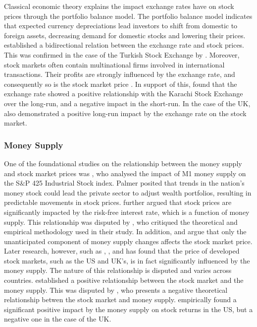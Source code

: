 \documentclass[11pt,a4paper]{article}
\newcommand{\citeboth}[1]{\citeauthor{#1} \citep{#1}}
\begin{document}
Classical economic theory explains the impact exchange rates have on stock prices through the portfolio balance model. The portfolio balance model indicates that expected currency depreciations lead investors to shift from domestic to foreign assets, decreasing demand for domestic stocks and lowering their prices. 
\citeboth{branson1977} established a bidirectional relation between the exchange rate and stock prices. This was confirmed
in the case of the Turkish Stock Exchange by \citeboth{aydemir2009}. 
Moreover, stock markets often contain multinational firms involved in international transactions. Their profits are strongly influenced by the exchange rate, and consequently so is the stock market price \citep{Wong2018}.
In support of this, \citeboth{khan2018} found that the exchange rate showed a positive relationship with the Karachi Stock Exchange over the long-run, and a negative impact in the short-run. 
In the case of the UK, \citeboth{wong2022} also demonstrated a positive long-run impact by the exchange rate on the stock market.

\subsubsection{Money Supply}

One of the foundational studies on the relationship between the money supply and 
stock market prices was \citeboth{palmer1970}, who analysed the impact of M1 money supply on the S$\&$P 425 Industrial Stock index. 
Palmer posited that trends in the nation's money stock could lead the 
private sector to adjust wealth portfolios, resulting in 
predictable movements in stock prices. \citeboth{homa1971} further argued that 
stock prices are significantly impacted by the risk-free interest rate, 
which is a function of money supply. This relationship was disputed by \citeboth{pesando1974}, 
who critiqued the theoretical and empirical methodology used in their study. In addition, \citeboth{sorensen1982} and 
\citeboth{bernanke2005} argue that only the unanticipated component of money supply changes 
affects the stock market price. Later research, however, such as \citeboth{bahloul2017}, 
\citeboth{synek2024}, and \citeboth{pícha2017} has found that the price of developed stock markets, such as the US and UK's, is in fact significantly influenced by the money supply. 
The nature of this relationship is disputed and varies across countries. \citeboth{homa1971} established a positive relationship between the 
stock market and the money supply. This was disputed by \citeboth{sellin2001}, who presents a negative theoretical relationship betwen the stock market and money supply. \citeboth{olawale2014} empirically found a significant positive impact by the money supply on stock returns in the US, but a negative one in the case of the UK. 
\end{document}
